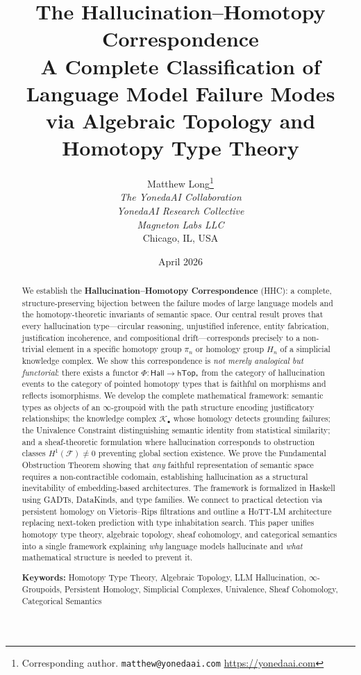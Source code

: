 \documentclass[11pt,a4paper]{article}
\title{%
  \textbf{The Hallucination--Homotopy Correspondence}\\[6pt]
  \large A Complete Classification of Language Model Failure Modes\\
  via Algebraic Topology and Homotopy Type Theory%
}
\author{%
  Matthew Long\thanks{%
    Corresponding author. \texttt{matthew@yonedaai.com} \;\textbullet\; \url{https://yonedaai.com}%
  }\\[2pt]
  \textit{The YonedaAI Collaboration}\\
  \textit{YonedaAI Research Collective}\\
  \textit{Magneton Labs LLC}\\
  Chicago, IL, USA
}
\date{April 2026}
\theoremstyle{plain}
\theoremstyle{definition}
\begin{document}
\maketitle
\thispagestyle{empty}

\begin{abstract}
\noindent
We establish the \textbf{Hallucination--Homotopy Correspondence} (HHC): a complete, structure-preserving bijection between the failure modes of large language models and the homotopy-theoretic invariants of semantic space. Our central result proves that every hallucination type---circular reasoning, unjustified inference, entity fabrication, justification incoherence, and compositional drift---corresponds precisely to a non-trivial element in a specific homotopy group $\pi_n$ or homology group $H_n$ of a simplicial knowledge complex. We show this correspondence is \emph{not merely analogical but functorial}: there exists a functor $\Phi\colon \mathsf{Hall} \to \mathsf{hTop}_*$ from the category of hallucination events to the category of pointed homotopy types that is faithful on morphisms and reflects isomorphisms. We develop the complete mathematical framework: semantic types as objects of an $\infty$-groupoid with the path structure encoding justificatory relationships; the knowledge complex $\mathcal{K}_\bullet$ whose homology detects grounding failures; the Univalence Constraint distinguishing semantic identity from statistical similarity; and a sheaf-theoretic formulation where hallucination corresponds to obstruction classes $H^1(\mathcal{F}) \neq 0$ preventing global section existence. We prove the Fundamental Obstruction Theorem showing that \emph{any} faithful representation of semantic space requires a non-contractible codomain, establishing hallucination as a structural inevitability of embedding-based architectures. The framework is formalized in Haskell using GADTs, DataKinds, and type families. We connect to practical detection via persistent homology on Vietoris--Rips filtrations and outline a HoTT-LM architecture replacing next-token prediction with type inhabitation search. This paper unifies homotopy type theory, algebraic topology, sheaf cohomology, and categorical semantics into a single framework explaining \emph{why} language models hallucinate and \emph{what} mathematical structure is needed to prevent it.

\medskip
\noindent\textbf{Keywords:} Homotopy Type Theory, Algebraic Topology, LLM Hallucination, $\infty$-Groupoids, Persistent Homology, Simplicial Complexes, Univalence, Sheaf Cohomology, Categorical Semantics
\end{abstract}
\end{document}
